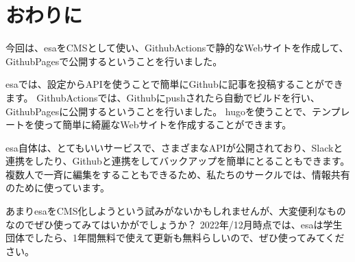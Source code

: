 \chapter{おわりに}

今回は、esaをCMSとして使い、GithubActionsで静的なWebサイトを作成して、GithubPagesで公開するということを行いました。

esaでは、設定からAPIを使うことで簡単にGithubに記事を投稿することができます。
GithubActionsでは、Githubにpushされたら自動でビルドを行い、GithubPagesに公開するということを行いました。
hugoを使うことで、テンプレートを使って簡単に綺麗なWebサイトを作成することができます。

esa自体は、とてもいいサービスで、さまざまなAPIが公開されており、Slackと連携をしたり、Githubと連携をしてバックアップを簡単にとることもできます。
複数人で一斉に編集をすることもできるため、私たちのサークルでは、情報共有のために使っています。

あまりesaをCMS化しようという試みがないかもしれませんが、大変便利なものなのでぜひ使ってみてはいかがでしょうか？
2022年/12月時点では、esaは学生団体でしたら、1年間無料で使えて更新も無料らしいので、ぜひ使ってみてください。

